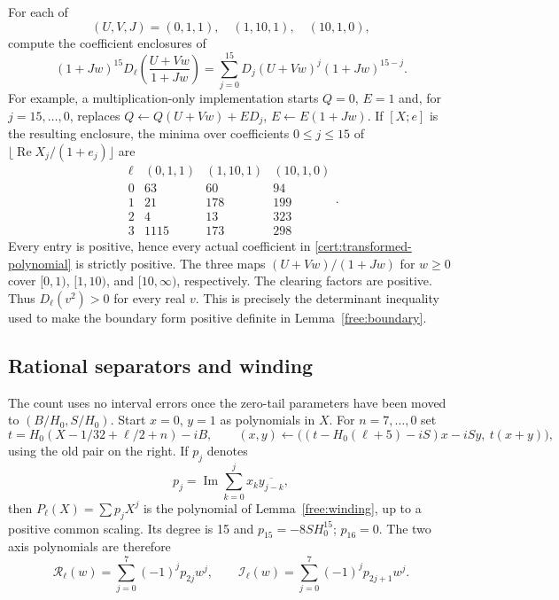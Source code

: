 \documentclass[11pt]{article}
\numberwithin{equation}{section}
\theoremstyle{definition}
\theoremstyle{remark}
\begin{document}
For each of
\begin{equation}\label{cert:substitutions}
 (U,V,J)=(0,1,1),\quad(1,10,1),\quad(10,1,0),
\end{equation}
compute the coefficient enclosures of
\begin{equation}\label{cert:transformed-polynomial}
 (1+Jw)^{15}D_\ell\left(\frac{U+Vw}{1+Jw}\right)
 =\sum_{j=0}^{15}D_j(U+Vw)^j(1+Jw)^{15-j}.
\end{equation}
For example, a multiplication-only implementation starts $Q=0$, $E=1$
and, for $j=15,\ldots,0$, replaces
$Q\leftarrow Q(U+Vw)+ED_j$, $E\leftarrow E(1+Jw)$.
If $[X;e]$ is the resulting enclosure, the minima over coefficients
$0\le j\le15$ of $\lfloor\operatorname{Re}X_j/(1+e_j)\rfloor$ are
\begin{equation}\label{cert:boundary-table}
 \begin{array}{c|rrr}
 \ell&(0,1,1)&(1,10,1)&(10,1,0)\\\hline
 0&63&60&94\\
 1&21&178&199\\
 2&4&13&323\\
 3&1115&173&298
 \end{array}.
\end{equation}
Every entry is positive, hence every actual coefficient in
\eqref{cert:transformed-polynomial} is strictly positive.  The three
maps $(U+Vw)/(1+Jw)$ for $w\ge0$ cover $[0,1)$, $[1,10)$, and
$[10,\infty)$, respectively.  The clearing factors are positive.
Thus $D_\ell(v^2)>0$ for every real $v$.  This is precisely the
determinant inequality used to make the boundary form positive
definite in Lemma~\ref{free:boundary}.

\subsection{Rational separators and winding}\label{cert:winding}

The count uses no interval errors once the zero-tail parameters have
been moved to $(B/H_0,S/H_0)$.  Start $x=0$, $y=1$ as polynomials in
$X$.  For $n=7,\ldots,0$ set
\[
 t=H_0(X-1/32+\ell/2+n)-iB,
 \qquad
 (x,y)\leftarrow
 \big((t-H_0(\ell+5)-iS)x-iSy,\ t(x+y)\big),
\]
using the old pair on the right.  If $p_j$ denotes
\begin{equation}\label{cert:p-coefficients}
 p_j=\operatorname{Im}\sum_{k=0}^j x_k\overline{y_{j-k}},
\end{equation}
then $P_\ell(X)=\sum p_jX^j$ is the polynomial of
Lemma~\ref{free:winding}, up to a positive common scaling.
Its degree is 15 and $p_{15}=-8SH_0^{15}$; $p_{16}=0$.
The two axis polynomials are therefore
\[
 \mathcal R_\ell(w)=\sum_{j=0}^7(-1)^jp_{2j}w^j,
 \qquad
 \mathcal I_\ell(w)=\sum_{j=0}^7(-1)^jp_{2j+1}w^j.
\]
\end{document}
